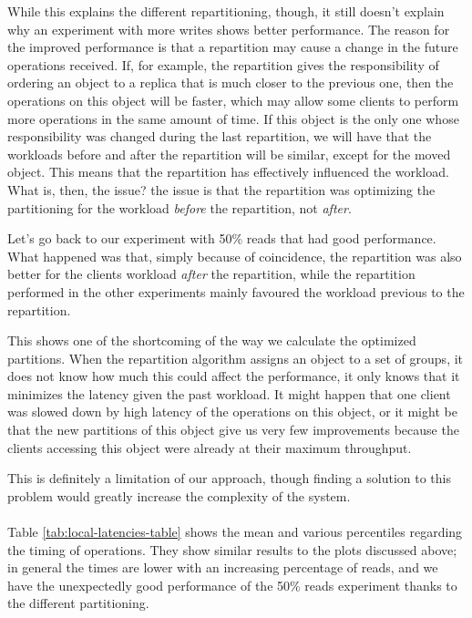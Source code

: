 While this explains the different repartitioning, though, it still doesn't explain why an experiment with more writes shows better performance. The reason for the improved performance is that a repartition may cause a change in the future operations received. If, for example, the repartition gives the responsibility of ordering an object to a replica that is much closer to the previous one, then the operations on this object will be faster, which may allow some clients to perform more operations in the same amount of time. If this object is the only one whose responsibility was changed during the last repartition, we will have that the workloads before and after the repartition will be similar, except for the moved object. This means that the repartition has effectively influenced the workload. What is, then, the issue? the issue is that the repartition was optimizing the partitioning for the workload \emph{before} the repartition, not \emph{after}. 

Let's go back to our experiment with 50\% reads that had good performance. What happened was that, simply because of coincidence, the repartition was also better for the clients workload \emph{after} the repartition, while the repartition performed in the other experiments mainly favoured the workload previous to the repartition.

This shows one of the shortcoming of the way we calculate the optimized partitions. When the repartition algorithm assigns an object to a set of groups, it does not know how much this could affect the performance, it only knows that it minimizes the latency given the past workload. It might happen that one client was slowed down by high latency of the operations on this object, or it might be that the new partitions of this object give us very few improvements because the clients accessing this object were already at their maximum throughput.

This is definitely a limitation of our approach, though finding a solution to this problem would greatly increase the complexity of the system.
\\\\
Table \ref{tab:local-latencies-table} shows the mean and various percentiles regarding the timing of operations. They show similar results to the plots discussed above; in general the times are lower with an increasing percentage of reads, and we have the unexpectedly good performance of the 50\% reads experiment thanks to the different partitioning.

